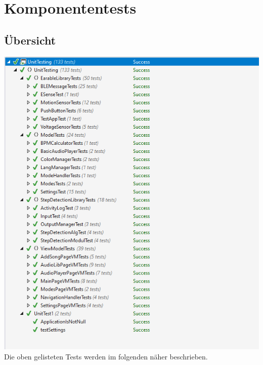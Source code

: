 \documentclass[../validierung.tex]{subfiles}
\begin{document}
\section{Komponententests}
	\subsection{Übersicht}
	\includegraphics[width=\textwidth]{alleok.png}
	Die oben gelisteten Tests werden im folgenden näher beschrieben.
\end{document}
